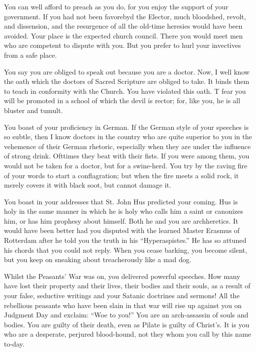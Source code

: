 You can well afford to preach as you do, for you enjoy the support of
your government. If you had not been favorebyd the Elector, much bloodshed,
revolt, and dissension, and the resurgence of all the old-time heresies
would have been avoided. Your place is the expected church council. There
you would meet men who are competent to dispute with you. But you prefer
to hurl your invectives from a safe place.

You say you are obliged to speak out because you are a doctor. Now,
I well know the oath which the doctors of Sacred Scripture are obliged to
take. It binds them to teach in conformity with the Church. You have
violated this oath. T fear you will be promoted in a school of which the devil
is rector; for, like you, he is all bluster and tumult.

You boast of your proficiency in German. If the German style of your
speeches is so subtle, then I know doctors in the country who are quite superior
to you in the vehemence of their German rhetoric, especially when
they are under the influence of strong drink. Ofttimes they beat with their
fists. If you were among them, you would not be taken for a doctor, but
for a swine-herd. You try by the raving fire of your words to start
a conflagration; but when the fire meets a solid rock, it merely covers it with
black soot, but cannot damage it.

You boast in your addresses that St. John Hus predicted your coming.
Hus is holy in the same manner in which he is holy who calls him a saint
or canonizes him, or has him prophesy about himself. Both he and you are
archheretics. It would have been better had you disputed with the learned
Master Erasmus of Rotterdam after he told you the
truth in his “Hyperaspistes.” He has so attuned his chords that you
could not reply. When you cease barking, you become silent, but you keep on sneaking about
treacherously like a mad dog.

Whilst the Peasants’ War was on, you delivered powerful speeches. How
many have lost their property and their lives, their bodies and their souls, as
a result of your false, seductive writings and your Satanic doctrines and
sermons! All the rebellious peasants who have been slain in that war will rise
up against you on Judgment Day and exclaim: “Woe to you!” You are an
arch-assassin of souls and bodies. You are guilty of their death, even as Pilate
is guilty of Christ’s. It is you who are a desperate, perjured blood-hound, not
they whom you call by this name to-day.

